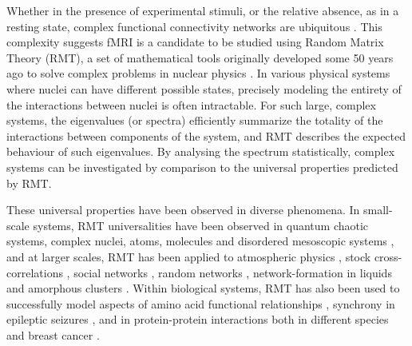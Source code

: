 \documentclass[NETN,manuscript]{stjour-new}
\begin{document}
Whether in the presence of experimental stimuli, or the relative absence, as in a resting state,
complex functional connectivity networks are ubiquitous
\citep{bucknerBrainDefaultNetwork2008,foxCoverHumanBrain2005,gonzalez-castilloTaskbasedDynamicFunctional2018,hermundstadStructuralFoundationsRestingstate2013}.
This complexity suggests fMRI is a candidate to be studied using Random Matrix Theory (RMT), a set
of mathematical tools originally developed some 50 years ago to solve complex problems in nuclear
physics \citep{guhrRandommatrixTheoriesQuantum1998a,mehtaRandomMatrices2004}. In various
physical systems where nuclei can have different possible states, precisely modeling the entirety of
the interactions between nuclei is often intractable. For such large, complex systems, the
eigenvalues (or spectra) efficiently summarize the totality of the interactions between components
of the system, and RMT describes the expected behaviour of such eigenvalues. By analysing the
spectrum statistically, complex systems can be investigated by comparison to the universal
properties predicted by RMT.

\begin{sloppypar}
These universal properties have been observed in diverse phenomena. In small-scale systems, RMT
universalities have been observed in quantum chaotic systems, complex nuclei, atoms, molecules and
disordered mesoscopic systems \cite{guhrRandommatrixTheoriesQuantum1998a,mehtaRandomMatrices2004,brodyRandommatrixPhysicsSpectrum1981,beenakkerRandommatrixTheoryQuantum1997,bohigasHigherOrderCorrelationsSpectra1985,wintgenLevelStatisticsQuantized1988,pandeySkewOrthogonalPolynomialsUniversality2001}, and at larger scales, RMT has been applied to atmospheric
physics \citep{santhanamStatisticsAtmosphericCorrelations2001}, stock cross-correlations \cite{plerouRandomMatrixApproach2002} , social networks \cite{jalanUncoveringRandomnessSuccess2014}, random networks \cite{bandyopadhyayUniversalityComplexNetworks2007},
network-formation in liquids \citep{sastrySpectralStatisticsInstantaneous2001,matharooSpectralStatisticsQuenched2009}  and amorphous clusters \citep{sarkarUniversalityVibrationalSpectra2004,matharooVibrationalSpectraAmorphous2005,matharooUniversalityVibrationalSpectra2008}. Within biological systems,
RMT has also been used to successfully model aspects of  amino acid functional relationships \citep{bhadolaTargetingFunctionalMotifs2016},
synchrony in epileptic seizures \citep{osorioPhasesynchronizationRandommatrixBased2011}, and in protein-protein interactions both in different species \citep{agrawalQuantifyingRandomnessProtein2014} and breast cancer \citep{raiRandomnessPreservedPatterns2015}.
\end{sloppypar}
\end{document}
